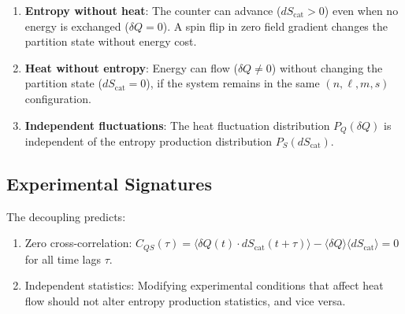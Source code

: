 \documentclass[twocolumn,10pt]{article}
\begin{document}
\begin{enumerate}
    \item \textbf{Entropy without heat}: The counter can advance ($dS_{\mathrm{cat}} > 0$) even when no energy is exchanged ($\delta Q = 0$). A spin flip in zero field gradient changes the partition state without energy cost.

    \item \textbf{Heat without entropy}: Energy can flow ($\delta Q \neq 0$) without changing the partition state ($dS_{\mathrm{cat}} = 0$), if the system remains in the same $(n, \ell, m, s)$ configuration.

    \item \textbf{Independent fluctuations}: The heat fluctuation distribution $P_Q(\delta Q)$ is independent of the entropy production distribution $P_S(dS_{\mathrm{cat}})$.
\end{enumerate}

\subsection{Experimental Signatures}

The decoupling predicts:

\begin{enumerate}
    \item Zero cross-correlation: $C_{QS}(\tau) = \langle \delta Q(t) \cdot dS_{\mathrm{cat}}(t+\tau) \rangle - \langle \delta Q \rangle \langle dS_{\mathrm{cat}} \rangle = 0$ for all time lags $\tau$.

    \item Independent statistics: Modifying experimental conditions that affect heat flow should not alter entropy production statistics, and vice versa.
\end{enumerate}
\end{document}

